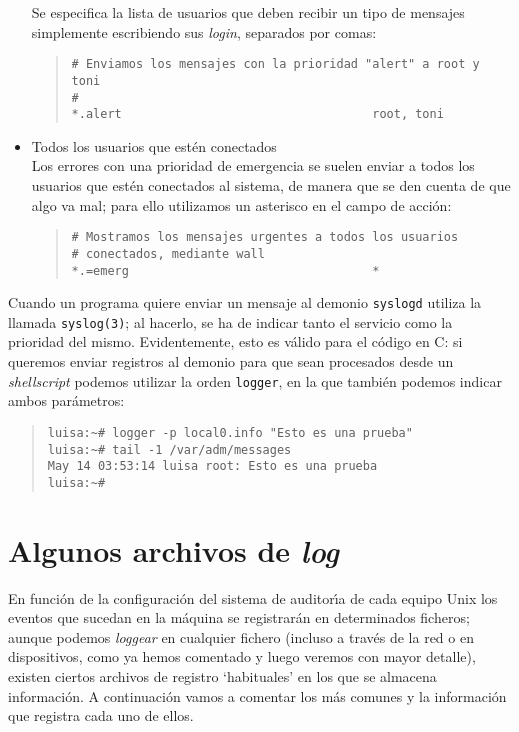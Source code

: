 \begin{itemize}
Se especifica la lista de usuarios que deben recibir un tipo de mensajes
simplemente escribiendo sus {\it login}, separados por comas:
\begin{quote}
\begin{verbatim}
# Enviamos los mensajes con la prioridad "alert" a root y toni
#
*.alert                                   root, toni
\end{verbatim}
\end{quote}
\item{}Todos los usuarios que est\'en conectados\\
Los errores con una prioridad de emergencia se suelen enviar a todos los
usuarios que est\'en conectados al sistema, de manera que se den cuenta de que
algo va mal; para ello utilizamos un asterisco en el campo de acci\'on:
\begin{quote}
\begin{verbatim}
# Mostramos los mensajes urgentes a todos los usuarios 
# conectados, mediante wall
*.=emerg                                  *
\end{verbatim}
\end{quote}
\end{itemize}
Cuando un programa quiere enviar un mensaje al demonio {\tt syslogd} utiliza
la llamada {\tt syslog(3)}; al hacerlo, se ha de indicar tanto el servicio como
la prioridad del mismo. Evidentemente, esto es v\'alido para el c\'odigo en C:
si queremos enviar registros al demonio para que sean procesados desde un {\it
shellscript} podemos utilizar la orden {\tt logger}, en la que tambi\'en podemos
indicar ambos par\'ametros:
\begin{quote}
\begin{verbatim}
luisa:~# logger -p local0.info "Esto es una prueba"
luisa:~# tail -1 /var/adm/messages 
May 14 03:53:14 luisa root: Esto es una prueba
luisa:~# 
\end{verbatim}
\end{quote}
\section{Algunos archivos de {\it log}}
En funci\'on de la configuraci\'on del sistema de auditor\'{\i}a de cada equipo
Unix los eventos que sucedan en la m\'aquina se registrar\'an en determinados
ficheros; aunque podemos {\it loggear} en cualquier fichero (incluso a trav\'es
de la red o en dispositivos, como ya hemos comentado y luego veremos con mayor
detalle), existen ciertos archivos de
registro `habituales' en los que se almacena informaci\'on. A continuaci\'on 
vamos a comentar los m\'as comunes y la informaci\'on que registra cada uno de
ellos. 
